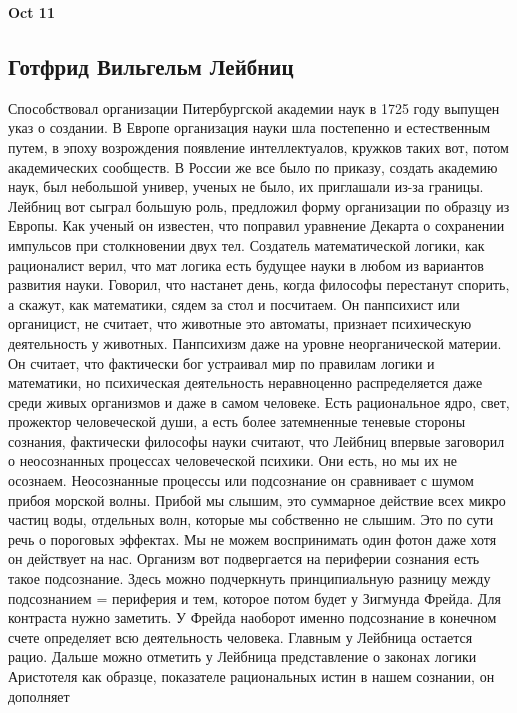 \documentclass[a4paper, 12pt]{article}
\begin{document}
\hfill\textbf{Oct 11}


\subsection{Готфрид Вильгельм Лейбниц}

Способствовал организации Питербургской академии наук в 1725 году 
выпущен указ о создании. В Европе организация науки шла постепенно 
и естественным путем, в эпоху возрождения появление интеллектуалов, 
кружков таких вот, потом академических сообществ. В России же все было 
по приказу, создать академию наук, был небольшой универ, ученых не было, 
их приглашали из-за границы. Лейбниц вот сыграл большую роль, предложил 
форму организации по образцу из Европы. Как ученый он известен, что 
поправил уравнение Декарта о сохранении импульсов при столкновении двух 
тел. Создатель математической логики, как рационалист верил, что мат 
логика есть будущее науки в любом из вариантов развития науки. Говорил, 
что настанет день, когда философы перестанут спорить, а скажут, как 
математики, сядем за стол и посчитаем. Он панпсихист или органицист, не 
считает, что животные это автоматы, признает психическую деятельность 
у животных. Панпсихизм даже на уровне неорганической материи. Он 
считает, что фактически бог устраивал мир по правилам логики 
и математики, но психическая деятельность неравноценно распределяется 
даже среди живых организмов и даже в самом человеке. Есть рациональное 
ядро, свет, прожектор человеческой души, а есть более затемненные 
теневые стороны сознания, фактически философы науки считают, что Лейбниц 
впервые заговорил о неосознанных процессах человеческой психики. Они 
есть, но мы их не осознаем. Неосознанные процессы или подсознание он 
сравнивает с шумом прибоя морской волны. Прибой мы слышим, это суммарное 
действие всех микро частиц воды, отдельных волн, которые мы собственно 
не слышим. Это по сути речь о пороговых эффектах. Мы не можем 
воспринимать один фотон даже хотя он действует на нас. Организм вот 
подвергается на периферии сознания есть такое подсознание. Здесь можно 
подчеркнуть принципиальную разницу между подсознанием = периферия и тем, 
которое потом будет у Зигмунда Фрейда. Для контраста нужно заметить. 
У Фрейда наоборот именно подсознание в конечном счете определяет всю 
деятельность человека. Главным у Лейбница остается рацио. Дальше можно 
отметить у Лейбница представление о законах логики Аристотеля как 
образце, показателе рациональных истин в нашем сознании, он дополняет 
\end{document}

